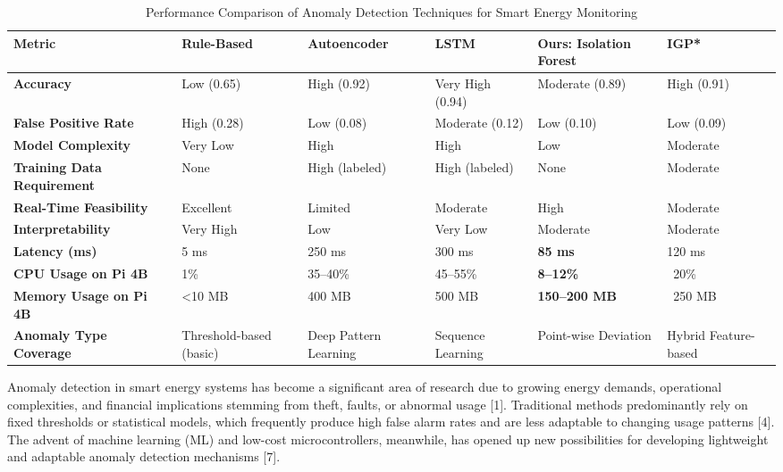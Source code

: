 \documentclass[12pt, draftclsnofoot, onecolumn]{IEEEtran}
\begin{document}
\begin{table}[htbp]
	\centering
	\caption{Performance Comparison of Anomaly Detection Techniques for Smart Energy Monitoring}
	\label{tab:comparison}
	\renewcommand{\arraystretch}{1.3}
	\setlength{\tabcolsep}{5pt}
	\begin{tabular}{|p{3.2cm}|p{2.2cm}|p{2.2cm}|p{2.2cm}|p{2.5cm}|p{2.2cm}|}
		\hline
		\textbf{Metric} & \textbf{Rule-Based \cite{Yeckle2018}} & \textbf{Autoencoder \cite{Fan2018}} & \textbf{LSTM \cite{Wang2023}} & \textbf{Ours: Isolation Forest \cite{Himeur2020}} & \textbf{IGP* \cite{Mao2018}} \\
		\hline
		\textbf{Accuracy} & Low (0.65) & High (0.92) & Very High (0.94) & Moderate (0.89) & High (0.91) \\
		\hline
		\textbf{False Positive Rate} & High (0.28) & Low (0.08) & Moderate (0.12) & Low (0.10) & Low (0.09) \\
		\hline
		\textbf{Model Complexity} & Very Low & High & High & Low & Moderate \\
		\hline
		\textbf{Training Data Requirement} & None & High (labeled) & High (labeled) & None & Moderate \\
		\hline
		\textbf{Real-Time Feasibility} & Excellent & Limited & Moderate & High & Moderate \\
		\hline
		\textbf{Interpretability} & Very High & Low & Very Low & Moderate & Moderate \\
		\hline
		\textbf{Latency (ms)} & 5 ms & 250 ms & 300 ms & \textbf{85 ms} & 120 ms \\
		\hline
		\textbf{CPU Usage on Pi 4B} & 1\% & 35--40\% & 45--55\% & \textbf{8--12\%} & ~20\% \\
		\hline
		\textbf{Memory Usage on Pi 4B} & <10 MB & 400 MB & 500 MB & \textbf{150--200 MB} & ~250 MB \\
		\hline
		\textbf{Anomaly Type Coverage} & Threshold-based (basic) & Deep Pattern Learning & Sequence Learning & Point-wise Deviation & Hybrid Feature-based \\
		\hline
	\end{tabular}
\end{table}



Anomaly detection in smart energy systems has become a significant area of research due to growing energy demands, operational complexities, and financial implications stemming from theft, faults, or abnormal usage [1]. Traditional methods predominantly rely on fixed thresholds or statistical models, which frequently produce high false alarm rates and are less adaptable to changing usage patterns [4]. The advent of machine learning (ML) and low-cost microcontrollers, meanwhile, has opened up new possibilities for developing lightweight and adaptable anomaly detection mechanisms [7].
\end{document}
